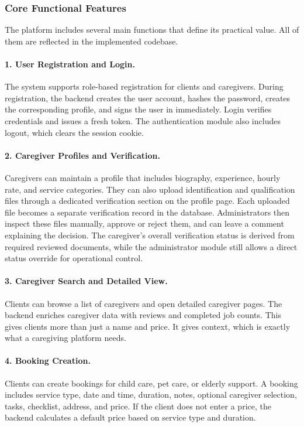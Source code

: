\documentclass[12pt,a4paper]{article}
\begin{document}
\subsubsection{Core Functional Features}

The platform includes several main functions that define its practical value. All of them are reflected in the implemented codebase.

\paragraph{1. User Registration and Login.}
The system supports role-based registration for clients and caregivers. During registration, the backend creates the user account, hashes the password, creates the corresponding profile, and signs the user in immediately. Login verifies credentials and issues a fresh token. The authentication module also includes logout, which clears the session cookie.

\paragraph{2. Caregiver Profiles and Verification.}
Caregivers can maintain a profile that includes biography, experience, hourly rate, and service categories. They can also upload identification and qualification files through a dedicated verification section on the profile page. Each uploaded file becomes a separate verification record in the database. Administrators then inspect these files manually, approve or reject them, and can leave a comment explaining the decision. The caregiver's overall verification status is derived from required reviewed documents, while the administrator module still allows a direct status override for operational control.

\paragraph{3. Caregiver Search and Detailed View.}
Clients can browse a list of caregivers and open detailed caregiver pages. The backend enriches caregiver data with reviews and completed job counts. This gives clients more than just a name and price. It gives context, which is exactly what a caregiving platform needs.

\paragraph{4. Booking Creation.}
Clients can create bookings for child care, pet care, or elderly support. A booking includes service type, date and time, duration, notes, optional caregiver selection, tasks, checklist, address, and price. If the client does not enter a price, the backend calculates a default price based on service type and duration.
\end{document}
